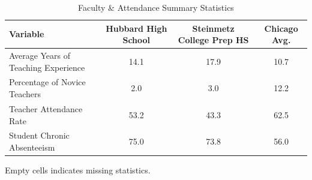 \begin{table}[H]
\renewcommand{\arraystretch}{1.5}
\caption*{
{\large Faculty \& Attendance Summary Statistics}
} 

\fontsize{10pt}{11pt}\selectfont

\begin{tabular*}{\linewidth}{@{\extracolsep{\fill}}lccc}
\toprule
Variable & Hubbard High School & Steinmetz College Prep HS & Chicago Avg. \\ 
\midrule\addlinespace[2.5pt]
Average Years of Teaching Experience & 14.1 & 17.9 & 10.7 \\
Percentage of Novice Teachers & 2.0 & 3.0 & 12.2 \\
Teacher Attendance Rate & 53.2 & 43.3 & 62.5 \\
Student Chronic Absenteeism & 75.0 & 73.8 & 56.0 \\
\bottomrule
\end{tabular*}
\begin{minipage}{\linewidth}
Empty cells indicates missing statistics.\\
\end{minipage}
\end{table}
